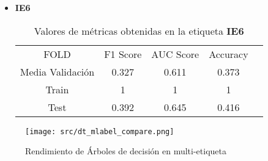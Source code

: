 \begin{itemize}
\begin{table}[H]
	      \end{table}
	\item  \textbf{IE6}
	      \begin{table}[H]
		      \centering
		      \begin{tabular}{|c|c|c|c|c}
			      \cline{1-4}
			      FOLD             & F1 Score & AUC Score & Accuracy \\ \cline{1-4}
			      Media Validación & 0.327    & 0.611     & 0.373    \\ \cline{1-4}
			      Train            & 1        & 1         & 1        \\ \cline{1-4}
			      Test             & 0.392    & 0.645     & 0.416    \\ \cline{1-4}
		      \end{tabular}
		      \caption{Valores de métricas obtenidas en la etiqueta \textbf{IE6}}
	      \end{table}
\end{itemize}

\begin{figure}[H]
	\centering
	\texttt{[image: src/dt\_mlabel\_compare.png]}
	\caption{Rendimiento de Árboles de decisión en multi-etiqueta}
	\label{fig:dtml_cmp}
\end{figure}
